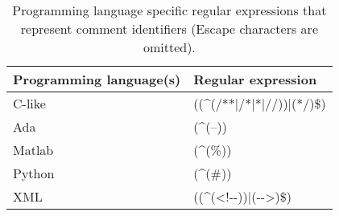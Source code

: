 
\begin{table}
	\caption[Comment enclosings]{Programming language specific regular expressions that represent comment identifiers (Escape characters are omitted).}
	\label{table:commentEnclosings}
	\begin{tabularx}{\textwidth}{l|L}
		\textbf{Programming language(s)} & Regular expression \\
		\hline
		C-like & ((\textasciicircum(/**|/*|*|//))|(*/)\$) \\
		Ada & (\textasciicircum(--)) \\
		Matlab & (\textasciicircum(\%)) \\
		Python & (\textasciicircum(\#)) \\
		XML & ((\textasciicircum(<!-{}-))|(-{}->)\$)
	\end{tabularx}
\end{table}